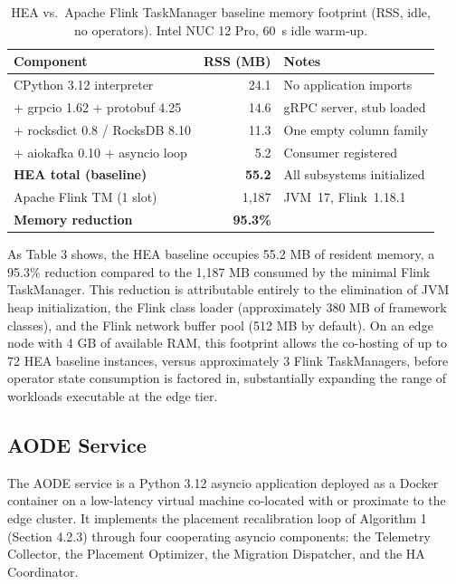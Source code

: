 \documentclass[preprint,review,12pt]{elsarticle}
\begin{document}
\begin{table}[htbp]
\centering
\caption{HEA vs.\ Apache Flink TaskManager baseline memory footprint (RSS, idle, no operators). Intel NUC 12 Pro, 60~s idle warm-up.}
\label{tab:memory}
\begin{tabular}{@{}lrl@{}}
\toprule
Component & RSS (MB) & Notes \\
\midrule
CPython 3.12 interpreter & 24.1 & No application imports \\
+ grpcio 1.62 + protobuf 4.25 & 14.6 & gRPC server, stub loaded \\
+ rocksdict 0.8 / RocksDB 8.10 & 11.3 & One empty column family \\
+ aiokafka 0.10 + asyncio loop & 5.2 & Consumer registered \\
\midrule
\textbf{HEA total (baseline)} & \textbf{55.2} & All subsystems initialized \\
Apache Flink TM (1 slot) & 1,187 & JVM~17, Flink~1.18.1 \\
\midrule
\textbf{Memory reduction} & \textbf{95.3\%} & \\
\bottomrule
\end{tabular}
\end{table}


As Table 3 shows, the HEA baseline occupies 55.2 MB of resident memory, a 95.3\% reduction compared to the 1,187 MB consumed by the minimal Flink TaskManager. This reduction is attributable entirely to the elimination of JVM heap initialization, the Flink class loader (approximately 380 MB of framework classes), and the Flink network buffer pool (512 MB by default). On an edge node with 4 GB of available RAM, this footprint allows the co-hosting of up to 72 HEA baseline instances, versus approximately 3 Flink TaskManagers, before operator state consumption is factored in, substantially expanding the range of workloads executable at the edge tier.

\subsection{AODE Service}\label{aode-service}

The AODE service is a Python 3.12 asyncio application deployed as a Docker container on a low-latency virtual machine co-located with or proximate to the edge cluster. It implements the placement recalibration loop of Algorithm 1 (Section 4.2.3) through four cooperating asyncio components: the Telemetry Collector, the Placement Optimizer, the Migration Dispatcher, and the HA Coordinator.
\end{document}
